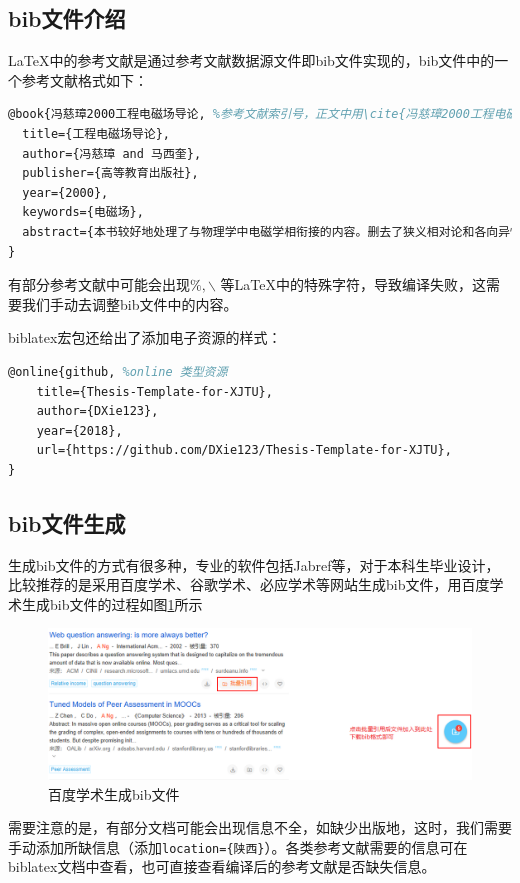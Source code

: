 \documentclass[bachelor]{XJTUthesis}
\begin{document}
\subsection{bib文件介绍}
\LaTeX 中的参考文献是通过参考文献数据源文件即bib文件实现的，bib文件中的一个参考文献格式如下：
\begin{lstlisting}[language=tex]
@book{冯慈璋2000工程电磁场导论, %参考文献索引号，正文中用\cite{冯慈璋2000工程电磁场导论}来索引该文献
  title={工程电磁场导论},
  author={冯慈璋 and 马西奎},
  publisher={高等教育出版社},
  year={2000},
  keywords={电磁场},
  abstract={本书较好地处理了与物理学中电磁学相衔接的内容。删去了狭义相对论和各向异性媒质中电磁场的内容,增加了准静态电磁场和波导与谐振腔的相应内容,适当拓展了强电专业的电磁场知识范围。书中突出了电磁场理论在工程实际中的应用。},
}
\end{lstlisting}
有部分参考文献中可能会出现$\%,\backslash$ 等\LaTeX 中的特殊字符，导致编译失败，这需要我们手动去调整bib文件中的内容。\par
biblatex宏包还给出了添加电子资源的样式：
\begin{lstlisting}[language=tex]
@online{github, %online 类型资源
    title={Thesis-Template-for-XJTU},
    author={DXie123},
    year={2018},
    url={https://github.com/DXie123/Thesis-Template-for-XJTU},
}
\end{lstlisting}

\subsection{bib文件生成}
生成bib文件的方式有很多种，专业的软件包括Jabref等，对于本科生毕业设计，比较推荐的是采用百度学术、谷歌学术、必应学术等网站生成bib文件，用百度学术生成bib文件的过程如图\ref{fig:bib}所示
\begin{figure}[htbp]
  \centering
  \includegraphics[width=\textwidth]{./figures/xueshu.png}
  \caption{百度学术生成bib文件}\label{fig:bib}
\end{figure}
需要注意的是，有部分文档可能会出现信息不全，如\cite{成永红2001电力设备绝缘检测与诊断}缺少出版地，这时，我们需要手动添加所缺信息（添加\verb|location={陕西}|）。各类参考文献需要的信息可在biblatex文档中查看，也可直接查看编译后的参考文献是否缺失信息。
\end{document}
